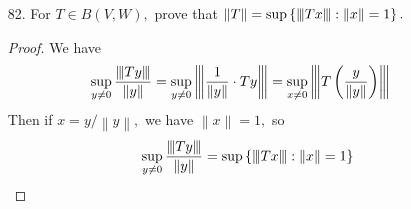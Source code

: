 \documentclass{article}
\newcommand{\vertiii}[1]{ { \left\vert\kern-0.25ex\left\vert\kern-0.25ex\left\vert #1 \right\vert\kern-0.25ex\right\vert\kern-0.25ex\right\vert} }
\begin{document}
\begin{itemize}
\begin{proof}
\begin{align*}
			\end{align*}
			By the result of \#82, we have
			\begin{align*}
				\left\lVert T \right\rVert &= \sup\left\{ \left\lVert T(f) \right\rVert:\left\lVert f \right\rVert = 1 \right\} \\
				&\ge \sup\left\{ b-a-\frac{h}{3}: h>0 \right\} = b-a
			\end{align*}
			but on the other hand, from earlier, we had
			\begin{align*}
				\left\lVert T(f)-T(g) \right\rVert&\le (b-a) \left\lVert f-g \right\rVert \\
				\implies \left\lVert T \right\rVert &= \sup_{f\not\equiv g} \frac{\left\lVert T(f)-T(g) \right\rVert}{\left\lVert f-g \right\rVert} \le b-a
			\end{align*}
			so $\left\lVert T \right\rVert = b-a.$
		\end{proof}

	\item[82.] For $T\in B(V, W),$ prove that $\left\lVert T \right\rVert=\sup\left\{ \vertiii{Tx}:\left\lVert x \right\rVert=1 \right\}.$
		\begin{proof}
			We have
			\begin{align*}
				\sup_{y\neq 0} \frac{\vertiii{Ty}}{\left\lVert y \right\rVert} &= \sup_{y\neq 0} \vertiii{\frac{1}{\left\lVert y \right\rVert}\cdot Ty} = \sup_{x\neq 0} \vertiii{T\left( \frac{y}{\left\lVert y \right\rVert} \right)}
			\end{align*}
			Then if $x=y/\left\lVert y \right\rVert,$ we have $\left\lVert x \right\rVert =1,$ so
			\begin{align*}
				\sup_{y\neq 0} \frac{\vertiii{Ty}}{\left\lVert y \right\rVert } = \sup\left\{ \vertiii{Tx}:\left\lVert x \right\rVert = 1 \right\}
			\end{align*}
		\end{proof}


\end{itemize}
\end{document}
